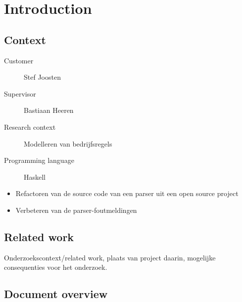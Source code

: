 
\section{Introduction}
\subsection{Context}
%
\begin{description}
	\item [Customer] Stef Joosten
	\item [Supervisor] Bastiaan Heeren
	\item [Research context] Modelleren van bedrijfsregels
	\item [Programming language] Haskell
\end{description}

\begin{itemize}
	\item Refactoren van de source code van een parser uit een open source project 
	\item Verbeteren van de parser-foutmeldingen
\end{itemize}

\subsection{Related work}
Onderzoekscontext/related work, plaats van project daarin, mogelijke consequenties voor het onderzoek.

\subsection{Document overview}
\lipsum[1]
